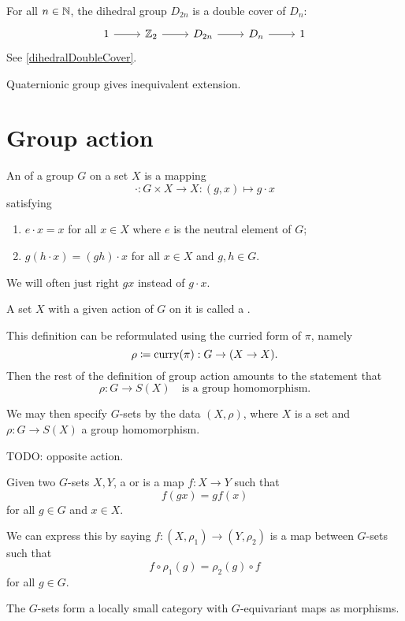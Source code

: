 \begin{example}
For all $n\in \mathbb{N}$, the dihedral group $D_{2n}$ is a double cover of $D_n$:
\[\begin{tikzcd}
1 \rar & \Z_2 \rar & D_{2n} \rar & D_n \rar & 1
\end{tikzcd} \]
See \ref{dihedralDoubleCover}.
\end{example}
Quaternionic group gives inequivalent extension.


\section{Group action}
\begin{definition}
An  of a group $G$ on a set $X$ is a mapping
\[ \cdot: G\times X \to X: (g,x) \mapsto g\cdot x \]
satisfying
\begin{enumerate}
\item $e\cdot x = x$ for all $x\in X$ where $e$ is the neutral element of $G$;
\item $g(h\cdot x) = (gh)\cdot x$ for all $x\in X$ and $g,h\in G$.
\end{enumerate}
We will often just right $gx$ instead of $g\cdot x$.

A set $X$ with a given action of $G$ on it is called a .
\end{definition}
This definition can be reformulated using the curried form of $\pi$, namely
\[ \rho \coloneqq \operatorname{curry}(\pi): G \to (X\to X). \]
Then the rest of the definition of group action amounts to the statement that 
\[ \rho: G \to S(X) \quad \text{is a group homomorphism.} \]

We may then specify $G$-sets by the data $(X,\rho)$, where $X$ is a set and $\rho: G \to S(X)$ a group homomorphism.

TODO: opposite action.

\begin{definition}
Given two $G$-sets $X,Y$, a  or  is a map $f:X \to Y$ such that
\[ f(gx) = gf(x) \]
for all $g\in G$ and $x\in X$.
\end{definition}
We can express this by saying $f: (X,\rho_1) \to (Y,\rho_2)$ is a map between $G$-sets such that
\[ f\circ \rho_1(g) = \rho_2(g)\circ f \]
for all $g\in G$.

\begin{lemma}
The $G$-sets form a locally small category with $G$-equivariant maps as morphisms.
\end{lemma}


